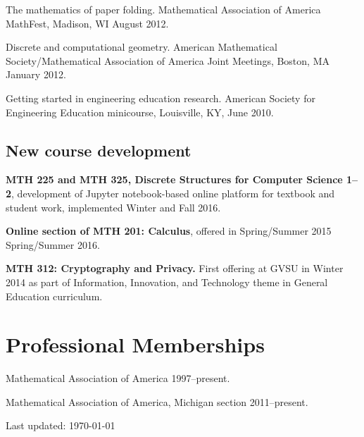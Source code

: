 \documentclass[letterpaper]{article}
\def\footerlink{}
\renewenvironment{itemize}{
  \begin{list}{}{
    \setlength{\leftmargin}{1.5em}
	\setlength{\itemsep}{0in}
  }
}{
  \end{list}
}
\begin{document}
\begin{itemize}
	\item The mathematics of paper folding. Mathematical Association of America MathFest, Madison, WI August 2012. 
	\item Discrete and computational geometry. American Mathematical Society/Mathematical Association of America Joint Meetings, Boston, MA January 2012. 
	\item Getting started in engineering education research. American Society for Engineering Education minicourse, Louisville, KY, June 2010. 
\end{itemize}

\subsection*{New course development}
\begin{itemize}
	\item \textbf{MTH 225 and MTH 325, Discrete Structures for Computer Science 1--2}, development of Jupyter notebook-based online platform for textbook and student work, implemented Winter and Fall 2016. 
	\item \textbf{Online section of MTH 201: Calculus}, offered in Spring/Summer 2015 Spring/Summer 2016.
	\item \textbf{MTH 312: Cryptography and Privacy. }First offering at GVSU in Winter 2014 as part of Information, Innovation, and Technology theme in General Education curriculum. 
\end{itemize}


\section*{Professional Memberships}
\begin{itemize}
	\item Mathematical Association of America 1997--present. 
	\item Mathematical Association of America, Michigan section 2011--present. 
\end{itemize}



\bigskip

\begin{center}
  \begin{footnotesize}
    Last updated: \today \\
  \end{footnotesize}
\end{center}
\end{document}

